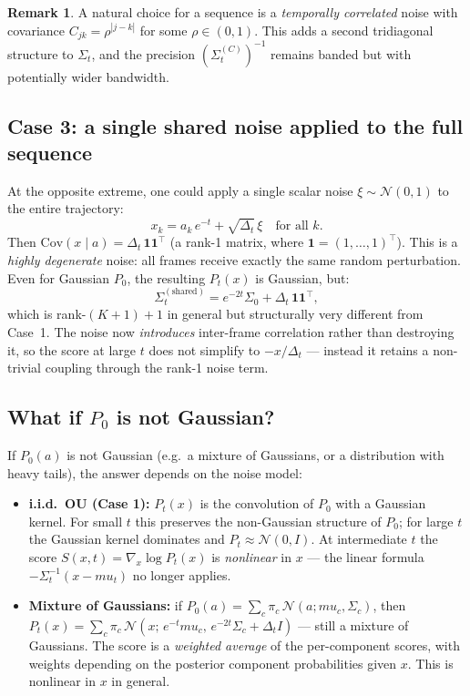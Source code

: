 \documentclass[12pt, a4paper]{article}
\def\ba{a}%
\def\bx{x}%
\def\bmu{mu}%
\def\bm#1{#1}%
\theoremstyle{definition}
\newtheorem{remark}{Remark}[section]
\newcommand{\N}{\mathcal{N}}
\newcommand{\ba}{\bm{a}}
\newcommand{\bx}{\bm{x}}
\newcommand{\bmu}{\bm{\mu}}
\newcommand{\dt}{\Delta_t}
\begin{document}
\begin{remark}
A natural choice for a sequence is a \emph{temporally correlated} noise
with covariance $C_{jk} = \rho^{|j-k|}$ for some $\rho \in (0,1)$.
This adds a second tridiagonal structure to $\Sigma_t$, and the
precision $(\Sigma_t^{(C)})^{-1}$ remains banded but with potentially
wider bandwidth.
\end{remark}

\subsection{Case 3: a single shared noise applied to the full sequence}

At the opposite extreme, one could apply a single scalar noise
$\xi \sim \N(0,1)$ to the entire trajectory:
\[
  x_k = a_k\,e^{-t} + \sqrt{\dt}\,\xi \quad \text{for all } k.
\]
Then $\text{Cov}(\bx\mid\ba) = \dt\,\mathbf{1}\mathbf{1}^\top$ (a rank-1
matrix, where $\mathbf{1} = (1,\ldots,1)^\top$). This is a \emph{highly
degenerate} noise: all frames receive exactly the same random
perturbation. Even for Gaussian $P_0$, the resulting $P_t(\bx)$ is
Gaussian, but:
\[
  \Sigma_t^{(\text{shared})}
  = e^{-2t}\Sigma_0 + \dt\,\mathbf{1}\mathbf{1}^\top,
\]
which is rank-$(K+1) + 1$ in general but structurally very different from
Case~1. The noise now \emph{introduces} inter-frame correlation rather
than destroying it, so the score at large $t$ does not simplify to
$-\bx/\dt$ — instead it retains a non-trivial coupling through the
rank-1 noise term.

\subsection{What if \texorpdfstring{$P_0$}{P0} is not Gaussian?}

If $P_0(\ba)$ is not Gaussian (e.g.\ a mixture of Gaussians, or a
distribution with heavy tails), the answer depends on the noise model:

\begin{itemize}
  \item \textbf{i.i.d.\ OU (Case 1):} $P_t(\bx)$ is the convolution of
    $P_0$ with a Gaussian kernel. For small $t$ this preserves the
    non-Gaussian structure of $P_0$; for large $t$ the Gaussian kernel
    dominates and $P_t \approx \N(\bm{0},I)$. At intermediate $t$ the
    score $\bm{S}(\bx,t) = \nabla_{\bx}\log P_t(\bx)$ is \emph{nonlinear}
    in $\bx$ — the linear formula $-\Sigma_t^{-1}(\bx-\bmu_t)$ no
    longer applies.

  \item \textbf{Mixture of Gaussians:} if
    $P_0(\ba) = \sum_c \pi_c\,\N(\ba;\bmu_c,\Sigma_c)$, then
    $P_t(\bx) = \sum_c \pi_c\,\N(\bx;\,e^{-t}\bmu_c,\,e^{-2t}\Sigma_c
    + \dt I)$ — still a mixture of Gaussians. The score is a
    \emph{weighted average} of the per-component scores, with
    weights depending on the posterior component probabilities given $\bx$.
    This is nonlinear in $\bx$ in general.
\end{itemize}
\end{document}
